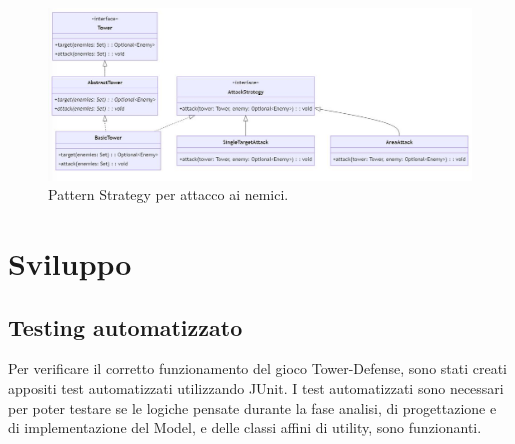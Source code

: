 \documentclass[a4paper,12pt]{report}
\begin{document}
\begin{figure}[H]
    \centering
    \includegraphics[width=0.8\linewidth]{defense_attack}
    \caption{Pattern Strategy per attacco ai nemici.}
    \label{fig:defense_attack}
\end{figure}

\chapter{Sviluppo}
\section{Testing automatizzato}
Per verificare il corretto funzionamento del gioco Tower-Defense, sono stati creati appositi test automatizzati utilizzando JUnit. 
I test automatizzati sono necessari per poter testare se le logiche pensate durante la fase analisi, di progettazione e di implementazione del Model, e delle classi affini di utility, sono funzionanti.
\end{document}
